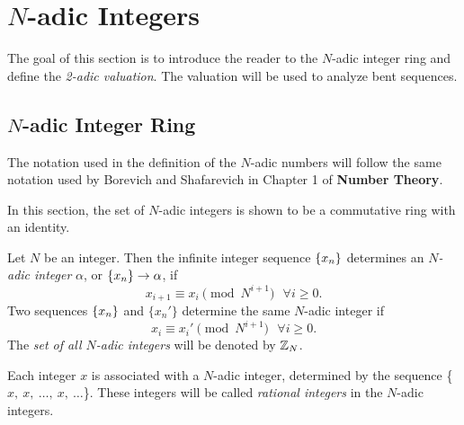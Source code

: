 \section{$N$-adic Integers}
\par The goal of this section is to introduce the reader to the $N$-adic
integer ring and define the {\em 2-adic valuation}. The valuation will be
used to analyze bent sequences.

\subsection{$N$-adic Integer Ring}
\par The notation used in the definition of the $N$-adic numbers will follow
the same notation used by Borevich and Shafarevich in Chapter 1 of
{\bf Number Theory}.

\par In this section, the set of $N$-adic integers is shown to be a
commutative ring with an identity.
  
\begin{definition}
\label{def:N-adic}
  Let $N$ be an integer. Then the infinite integer sequence $\{x_n\}$
  determines an {\em $N$-adic integer} $\alpha$, or
  $\{x_n\} \rightarrow \alpha$, if
  \begin{equation} \label{eq:seq}
  x_{i+1} \equiv x_i\pmod{N^{i+1}} \ \ \ \forall i \geq 0.
  \end{equation}
  Two sequences $\{x_n\}$ and $\{x_n'\}$ determine the same $N$-adic integer if 
\begin{equation} \label{eq:equiv}
  x_i \equiv x_i' \pmod{N^{i+1}}\ \ \ \forall i \geq 0.
\end{equation}
  The {\em set of all $N$-adic integers} will be denoted by $\mathbb{Z}_N$.
\end{definition}

\par Each integer $x$ is associated with a $N$-adic integer, determined
by the sequence \{$x,\ x, \ \dots, \ x,\ \dots$\}. These integers will be
called {\em rational integers} in the $N$-adic integers.
	
